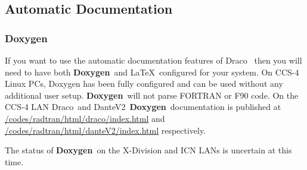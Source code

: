 \documentclass[11pt]{nmemo}
\newcommand{\draco}{{\normalfont\sffamily Draco}}
\newcommand{\dante}{{\normalfont\sffamily DanteV2}}
\newcommand{\doxygen}{{\normalfont\bfseries Doxygen}}
\begin{document}

\subsection{Automatic Documentation}

\subsubsection{Doxygen}
\label{doxygen}

If you want to use the automatic documentation features of
\draco~\cite{doxygen} then you will need to have both \doxygen\ and
\LaTeX\ configured for your system.  On CCS-4 Linux PCs, Doxygen has
been fully configured and can be used without any additional user
setup. \doxygen\ will not parse FORTRAN or F90 code.  On the CCS-4 LAN
\draco\ and \dante\ \doxygen\ documentation is published at
\url{/codes/radtran/html/draco/index.html} and
\url{/codes/radtran/html/danteV2/index.html} respectively.

The status of \doxygen\ on the X-Division and ICN LANs is uncertain at
this time.





\end{document}
